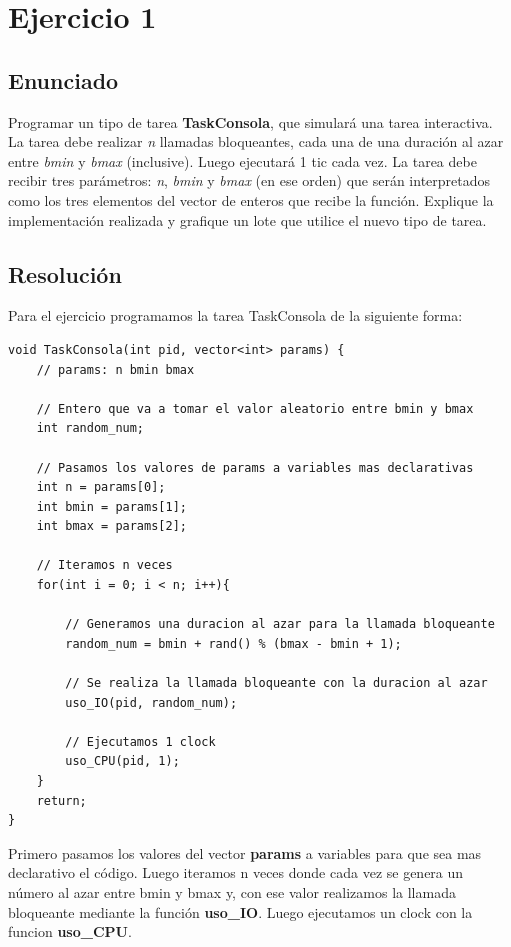 \section{Ejercicio 1}

\subsection{Enunciado}
Programar un tipo de tarea \textbf{TaskConsola}, que simulará una tarea interactiva.
La tarea debe realizar \textit{n} llamadas bloqueantes, cada una de una duración al azar entre \textit{bmin} y \textit{bmax} (inclusive). 
Luego ejecutará 1 tic cada vez. 
La tarea debe recibir tres parámetros: \textit{n}, \textit{bmin} y \textit{bmax} (en ese orden) que serán interpretados como los tres elementos del vector de enteros que recibe la función. Explique la implementación realizada y grafique un lote que utilice el nuevo tipo de tarea.

\subsection{Resolución}

Para el ejercicio programamos la tarea TaskConsola de la siguiente forma:

\begin{lstlisting}
void TaskConsola(int pid, vector<int> params) {
	// params: n bmin bmax
	
	// Entero que va a tomar el valor aleatorio entre bmin y bmax
	int random_num;
	
	// Pasamos los valores de params a variables mas declarativas
	int n = params[0];
	int bmin = params[1];
	int bmax = params[2];

	// Iteramos n veces
	for(int i = 0; i < n; i++){
		
		// Generamos una duracion al azar para la llamada bloqueante
		random_num = bmin + rand() % (bmax - bmin + 1);

		// Se realiza la llamada bloqueante con la duracion al azar
		uso_IO(pid, random_num);

		// Ejecutamos 1 clock
		uso_CPU(pid, 1);
	}
	return;
}
\end{lstlisting}

Primero pasamos los valores del vector \textbf{params} a variables para que sea mas declarativo el código. Luego iteramos n veces donde cada vez se genera un número al azar entre bmin y bmax y, con ese valor realizamos la llamada bloqueante mediante la función \textbf{uso\_IO}. Luego ejecutamos un clock con la funcion \textbf{uso\_CPU}.

